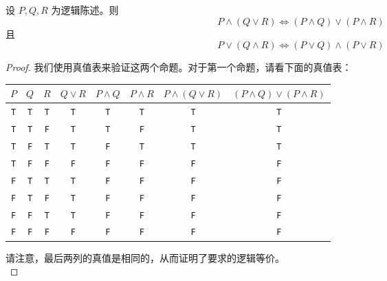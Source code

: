 \begin{theorem}
    设 $P, Q, R$ 为逻辑陈述。则
    \[P \land (Q \lor R) \iff (P \land Q) \lor (P \land R)\]
    且
    \[P \lor (Q \land R) \iff (P \lor Q) \land (P \lor R)\]
\end{theorem}

\begin{proof}
    我们使用真值表来验证这两个命题。对于第一个命题，请看下面的真值表：
    \begin{center}
        \begin{tabular}{c|c|c|c|c|c|c|c}
              $P$ & $Q$ & $R$ & $Q \lor R$ & $P \land Q$  & $P \land R$ & $P \land (Q \lor R)$ & $(P \land Q) \lor (P \land R)$ \\
              \hline
              \verb|T| & \verb|T| & \verb|T| &  \verb|T|  &   \verb|T|   &\verb|T| &\verb|T| &   \verb|T|   \\
              \verb|T| & \verb|T| & \verb|F| &  \verb|T|  &   \verb|T|   &\verb|F| &\verb|T| &   \verb|T|   \\
              \verb|T| & \verb|F| & \verb|T| &  \verb|T|  &   \verb|F|   &\verb|T| &\verb|T| &   \verb|T|   \\
              \verb|T| & \verb|F| & \verb|F| &  \verb|F|  &   \verb|F|   &\verb|F| &\verb|F| &   \verb|F|   \\
              \verb|F| & \verb|T| & \verb|T| &  \verb|T|  &   \verb|F|   &\verb|F| &\verb|F| &   \verb|F|   \\
              \verb|F| & \verb|T| & \verb|F| &  \verb|T|  &   \verb|F|   &\verb|F| &\verb|F| &   \verb|F|   \\
              \verb|F| & \verb|F| & \verb|T| &  \verb|T|  &   \verb|F|   &\verb|F| &\verb|F| &   \verb|F|   \\
              \verb|F| & \verb|F| & \verb|F| &  \verb|F|  &   \verb|F|   &\verb|F| &\verb|F| &   \verb|F|   \\
        \end{tabular}
    \end{center}

    请注意，最后两列的真值是相同的，从而证明了要求的逻辑等价。\\


\end{proof}
